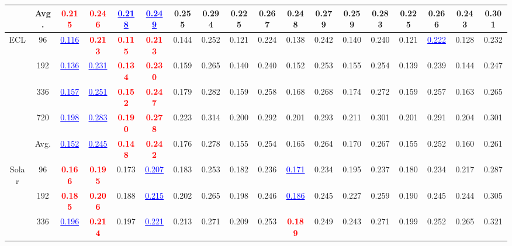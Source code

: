 \begin{table}[t]
{\begin{tabular}{cc|cc|cc|cc|cc|cc|cc|cc|cc}
\cmidrule(lr){2-18}
 & Avg. & \textcolor{red}{\textbf{0.215}} & \textcolor{red}{\textbf{0.246}} & \textcolor{blue}{\underline{0.218}} & \textcolor{blue}{\underline{0.249}} & 0.255 & 0.294 & 0.225 & 0.267 & 0.248 & 0.279 & 0.259 & 0.283 & 0.225 & 0.266 & 0.243 & 0.301 \\
\midrule
\multirow{5}{*}{ECL} & 96 & \textcolor{blue}{\underline{0.116}} & \textcolor{red}{\textbf{0.213}} & \textcolor{red}{\textbf{0.115}} & \textcolor{red}{\textbf{0.213}} & 0.144 & 0.252 & 0.121 & 0.224 & 0.138 & 0.242 & 0.140 & 0.240 & 0.121 & \textcolor{blue}{\underline{0.222}} & 0.128 & 0.232 \\
 & 192 & \textcolor{blue}{\underline{0.136}} & \textcolor{blue}{\underline{0.231}} & \textcolor{red}{\textbf{0.134}} & \textcolor{red}{\textbf{0.230}} & 0.159 & 0.265 & 0.140 & 0.240 & 0.152 & 0.253 & 0.155 & 0.254 & 0.139 & 0.239 & 0.144 & 0.247 \\
 & 336 & \textcolor{blue}{\underline{0.157}} & \textcolor{blue}{\underline{0.251}} & \textcolor{red}{\textbf{0.152}} & \textcolor{red}{\textbf{0.247}} & 0.179 & 0.282 & 0.159 & 0.258 & 0.168 & 0.268 & 0.174 & 0.272 & 0.159 & 0.257 & 0.163 & 0.265 \\
 & 720 & \textcolor{blue}{\underline{0.198}} & \textcolor{blue}{\underline{0.283}} & \textcolor{red}{\textbf{0.190}} & \textcolor{red}{\textbf{0.278}} & 0.223 & 0.314 & 0.200 & 0.292 & 0.201 & 0.293 & 0.211 & 0.301 & 0.201 & 0.291 & 0.204 & 0.301 \\
\cmidrule(lr){2-18}
 & Avg. & \textcolor{blue}{\underline{0.152}} & \textcolor{blue}{\underline{0.245}} & \textcolor{red}{\textbf{0.148}} & \textcolor{red}{\textbf{0.242}} & 0.176 & 0.278 & 0.155 & 0.254 & 0.165 & 0.264 & 0.170 & 0.267 & 0.155 & 0.252 & 0.160 & 0.261 \\
\midrule
\multirow{5}{*}{Solar} & 96 & \textcolor{red}{\textbf{0.166}} & \textcolor{red}{\textbf{0.195}} & 0.173 & \textcolor{blue}{\underline{0.207}} & 0.183 & 0.253 & 0.182 & 0.236 & \textcolor{blue}{\underline{0.171}} & 0.234 & 0.195 & 0.237 & 0.180 & 0.234 & 0.217 & 0.287 \\
 & 192 & \textcolor{red}{\textbf{0.185}} & \textcolor{red}{\textbf{0.206}} & 0.188 & \textcolor{blue}{\underline{0.215}} & 0.202 & 0.265 & 0.198 & 0.246 & \textcolor{blue}{\underline{0.186}} & 0.245 & 0.227 & 0.259 & 0.190 & 0.245 & 0.244 & 0.305 \\
 & 336 & \textcolor{blue}{\underline{0.196}} & \textcolor{red}{\textbf{0.214}} & 0.197 & \textcolor{blue}{\underline{0.221}} & 0.213 & 0.271 & 0.209 & 0.253 & \textcolor{red}{\textbf{0.189}} & 0.249 & 0.243 & 0.271 & 0.199 & 0.252 & 0.265 & 0.321 \\

\end{tabular}}
\end{table}
